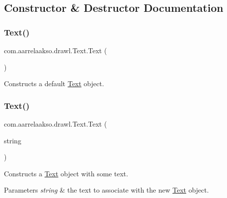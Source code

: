 \subsection{Constructor \& Destructor Documentation}
\mbox{\label{classcom_1_1aarrelaakso_1_1drawl_1_1_text_a9d9bdd3df91ff551c7bf96f741cde0e9}} 
\subsubsection{\texorpdfstring{Text()}{Text()}\hspace{0.1cm}{\footnotesize\ttfamily [1/2]}}
{\footnotesize\ttfamily com.\+aarrelaakso.\+drawl.\+Text.\+Text (\begin{DoxyParamCaption}{ }\end{DoxyParamCaption})}



Constructs a default \hyperlink{classcom_1_1aarrelaakso_1_1drawl_1_1_text}{Text} object. 

\mbox{\label{classcom_1_1aarrelaakso_1_1drawl_1_1_text_a8a30634e847c9c235c97aa3c20f991b7}} 
\subsubsection{\texorpdfstring{Text()}{Text()}\hspace{0.1cm}{\footnotesize\ttfamily [2/2]}}
{\footnotesize\ttfamily com.\+aarrelaakso.\+drawl.\+Text.\+Text (\begin{DoxyParamCaption}\item[{@Not\+Null final String}]{string }\end{DoxyParamCaption})}



Constructs a \hyperlink{classcom_1_1aarrelaakso_1_1drawl_1_1_text}{Text} object with some text. 


\begin{DoxyParams}{Parameters}
{\em string} & the text to associate with the new \hyperlink{classcom_1_1aarrelaakso_1_1drawl_1_1_text}{Text} object. \\
\hline
\end{DoxyParams}


